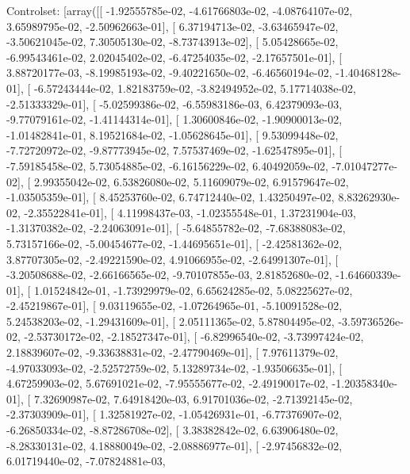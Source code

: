 \documentclass{article}
\begin{document}
Controlset: [array([[ -1.92555785e-02,  -4.61766803e-02,  -4.08764107e-02,
          3.65989795e-02,  -2.50962663e-01],
       [  6.37194713e-02,  -3.63465947e-02,  -3.50621045e-02,
          7.30505130e-02,  -8.73743913e-02],
       [  5.05428665e-02,  -6.99543461e-02,   2.02045402e-02,
         -6.47254035e-02,  -2.17657501e-01],
       [  3.88720177e-03,  -8.19985193e-02,  -9.40221650e-02,
         -6.46560194e-02,  -1.40468128e-01],
       [ -6.57243444e-02,   1.82183759e-02,  -3.82494952e-02,
          5.17714038e-02,  -2.51333329e-01],
       [ -5.02599386e-02,  -6.55983186e-03,   6.42379093e-03,
         -9.77079161e-02,  -1.41144314e-01],
       [  1.30600846e-02,  -1.90900013e-02,  -1.01482841e-01,
          8.19521684e-02,  -1.05628645e-01],
       [  9.53099448e-02,  -7.72720972e-02,  -9.87773945e-02,
          7.57537469e-02,  -1.62547895e-01],
       [ -7.59185458e-02,   5.73054885e-02,  -6.16156229e-02,
          6.40492059e-02,  -7.01047277e-02],
       [  2.99355042e-02,   6.53826080e-02,   5.11609079e-02,
          6.91579647e-02,  -1.03505359e-01],
       [  8.45253760e-02,   6.74712440e-02,   1.43250497e-02,
          8.83262930e-02,  -2.35522841e-01],
       [  4.11998437e-03,  -1.02355548e-01,   1.37231904e-03,
         -1.31370382e-02,  -2.24063091e-01],
       [ -5.64855782e-02,  -7.68388083e-02,   5.73157166e-02,
         -5.00454677e-02,  -1.44695651e-01],
       [ -2.42581362e-02,   3.87707305e-02,  -2.49221590e-02,
          4.91066955e-02,  -2.64991307e-01],
       [ -3.20508688e-02,  -2.66166565e-02,  -9.70107855e-03,
          2.81852680e-02,  -1.64660339e-01],
       [  1.01524842e-01,  -1.73929979e-02,   6.65624285e-02,
          5.08225627e-02,  -2.45219867e-01],
       [  9.03119655e-02,  -1.07264965e-01,  -5.10091528e-02,
          5.24538203e-02,  -1.29431609e-01],
       [  2.05111365e-02,   5.87804495e-02,  -3.59736526e-02,
         -2.53730172e-02,  -2.18527347e-01],
       [ -6.82996540e-02,  -3.73997424e-02,   2.18839607e-02,
         -9.33638831e-02,  -2.47790469e-01],
       [  7.97611379e-02,  -4.97033093e-02,  -2.52572759e-02,
          5.13289734e-02,  -1.93506635e-01],
       [  4.67259903e-02,   5.67691021e-02,  -7.95555677e-02,
         -2.49190017e-02,  -1.20358340e-01],
       [  7.32690987e-02,   7.64918420e-03,   6.91701036e-02,
         -2.71392145e-02,  -2.37303909e-01],
       [  1.32581927e-02,  -1.05426931e-01,  -6.77376907e-02,
         -6.26850334e-02,  -8.87286708e-02],
       [  3.38382842e-02,   6.63906480e-02,  -8.28330131e-02,
          4.18880049e-02,  -2.08886977e-01],
       [ -2.97456832e-02,   6.01719440e-02,  -7.07824881e-03,
\end{document}
